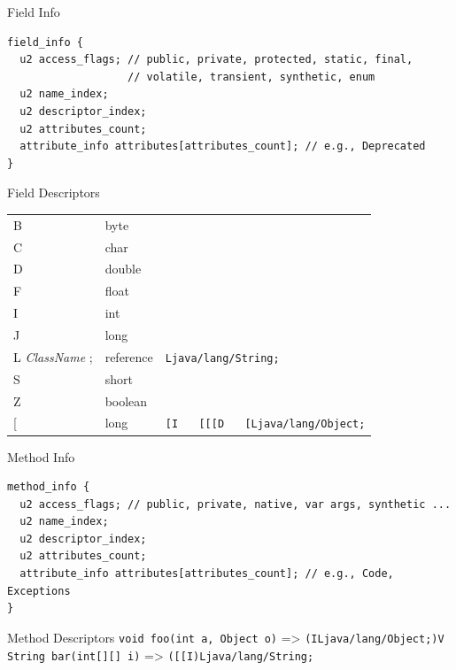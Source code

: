 \documentclass[
14pt,
aspectratio=169,
usenames,
dvipsnames,
x11names]{beamer}
\begin{document}
\begin{frame}[fragile]{Field Info}
\begin{lstlisting}
field_info {
  u2 access_flags; // public, private, protected, static, final,
                   // volatile, transient, synthetic, enum
  u2 name_index;
  u2 descriptor_index;
  u2 attributes_count;
  attribute_info attributes[attributes_count]; // e.g., Deprecated
}
\end{lstlisting}
\end{frame}

\begin{frame}{Field Descriptors}
  \begin{tabular}{l | l | l}
    B             & byte      &                                                                       \\
    C             & char      &                                                                       \\
    D             & double    &                                                                       \\
    F             & float     &                                                                       \\
    I             & int       &                                                                       \\
    J             & long      &                                                                       \\
    L \textit{ClassName} ; & reference & \texttt{Ljava/lang/String;}                                           \\
    S             & short     &                                                                       \\
    Z             & boolean   &                                                                       \\\relax
    [             & long      & \texttt{[I} ~~ \texttt{[[[D} ~~  \texttt{[Ljava/lang/Object;} \\
  \end{tabular}
\end{frame}

\begin{frame}[fragile]{Method Info}
\begin{lstlisting}
method_info {
  u2 access_flags; // public, private, native, var args, synthetic ...
  u2 name_index;
  u2 descriptor_index;
  u2 attributes_count;
  attribute_info attributes[attributes_count]; // e.g., Code, Exceptions
}
\end{lstlisting}
\begin{exampleblock}{Method Descriptors}
  \texttt{void foo(int a, Object o)} => \texttt{(ILjava/lang/Object;)V}\\
  \texttt{String bar(int[][] i)} => \texttt{([[I)Ljava/lang/String;}
\end{exampleblock}
\end{frame}
\end{document}
